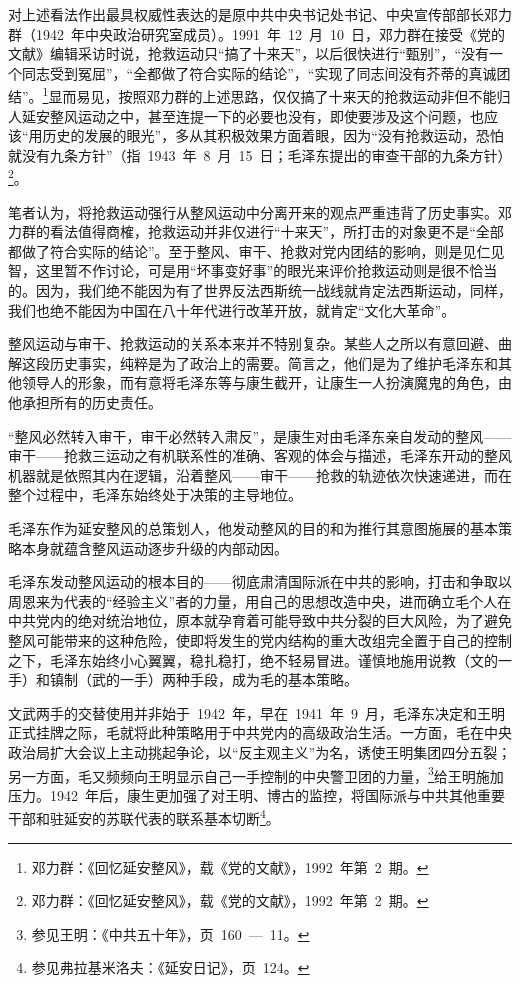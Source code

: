 对上述看法作出最具权威性表达的是原中共中央书记处书记、中央宣传部部长邓力群（1942~年中央政治研究室成员）。1991~年~12~月~10~日，邓力群在接受《党的文献》编辑采访时说，抢救运动只“搞了十来天”，以后很快进行“甄别”，“没有一个同志受到冤屈”，“全都做了符合实际的结论”，“实现了同志间没有芥蒂的真诚团结”。\footnote{邓力群：《回忆延安整风》，载《党的文献》，1992~年第~2~期。}显而易见，按照邓力群的上述思路，仅仅搞了十来天的抢救运动非但不能归人延安整风运动之中，甚至连提一下的必要也没有，即使要涉及这个问题，也应该“用历史的发展的眼光”，多从其积极效果方面着眼，因为“没有抢救运动，恐怕就没有九条方针”（指~1943~年~8~月~15~日；毛泽东提出的审查干部的九条方针）\footnote{邓力群：《回忆延安整风》，载《党的文献》，1992~年第~2~期。}。

笔者认为，将抢救运动强行从整风运动中分离开来的观点严重违背了历史事实。邓力群的看法值得商榷，抢救运动并非仅进行“十来天”，所打击的对象更不是“全部都做了符合实际的结论”。至于整风、审干、抢救对党内团结的影响，则是见仁见智，这里暂不作讨论，可是用“坏事变好事”的眼光来评价抢救运动则是很不恰当的。因为，我们绝不能因为有了世界反法西斯统一战线就肯定法西斯运动，同样，我们也绝不能因为中国在八十年代进行改革开放，就肯定“文化大革命”。

整风运动与审干、抢救运动的关系本来并不特别复杂。某些人之所以有意回避、曲解这段历史事实，纯粹是为了政治上的需要。简言之，他们是为了维护毛泽东和其他领导人的形象，而有意将毛泽东等与康生截开，让康生一人扮演魔鬼的角色，由他承担所有的历史责任。

“整风必然转入审干，审干必然转入肃反”，是康生对由毛泽东亲自发动的整风——审干——抢救三运动之有机联系性的准确、客观的体会与描述，毛泽东开动的整风机器就是依照其内在逻辑，沿着整风——审干——抢救的轨迹依次快速递进，而在整个过程中，毛泽东始终处于决策的主导地位。

毛泽东作为延安整风的总策划人，他发动整风的目的和为推行其意图施展的基本策略本身就蕴含整风运动逐步升级的内部动因。

毛泽东发动整风运动的根本目的——彻底肃清国际派在中共的影响，打击和争取以周恩来为代表的“经验主义”者的力量，用自己的思想改造中央，进而确立毛个人在中共党内的绝对统治地位，原本就孕育着可能导致中共分裂的巨大风险，为了避免整风可能带来的这种危险，使即将发生的党内结构的重大改组完全置于自己的控制之下，毛泽东始终小心翼翼，稳扎稳打，绝不轻易冒进。谨慎地施用说教（文的一手）和镇制（武的一手）两种手段，成为毛的基本策略。

文武两手的交替使用并非始于~1942~年，早在~1941~年~9~月，毛泽东决定和王明正式挂牌之际，毛就将此种策略用于中共党内的高级政治生活。一方面，毛在中央政治局扩大会议上主动挑起争论，以“反主观主义”为名，诱使王明集团四分五裂；另一方面，毛又频频向王明显示自己一手控制的中央警卫团的力量，\footnote{参见王明：《中共五十年》，页~160~—~11。}给王明施加压力。1942~年后，康生更加强了对王明、博古的监控，将国际派与中共其他重要干部和驻延安的苏联代表的联系基本切断\footnote{参见弗拉基米洛夫：《延安日记》，页~124。}。

